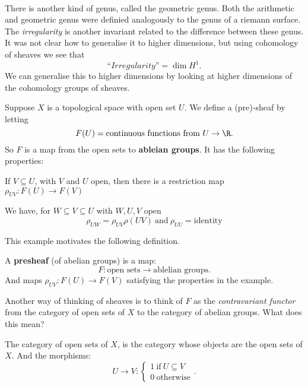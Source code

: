 \

There is another kind of genus, called the geometric genus. Both the arithmetic and geometric genus were definied analogously to the genus of a riemann surface. The \textit{irregularity} is another invariant related to the difference between these genus. It was not clear how to generalise it to higher dimensions, but using cohomology of sheaves we see that \[
   \textit{``Irregularity''}=\dim H^1.\]
 We can generalise this to higher dimensions by looking at higher dimensions of the cohomology groups of sheaves.


\begin{example}[]
    Suppose $X$ is a topological space with open set $U$. We define a (pre)-sheaf by letting  \[
    F(U) = \text{continuous functions from }U\rightarrow \R.\]
    So $F$ is a map from the open sets to \textbf{ableian groups}. It has the following properties:
    \begin{properties}
    \item If $V\subseteq U$, with  $V$ and  $U$ open, then there is a restriction map $\rho_{UV}\colon F(U)\rightarrow F(V)$
    \item We have, for $W\subseteq V\subseteq U$ with $W,U,V$ open \[
 \rho_{UW} = \rho_{UV}\rho(UV) \ \text{and} \ \rho_{UU} = \text{identity}
\] 
    \end{properties}
\end{example}

This example motivates the following definition.

\begin{definition}
A \textbf{presheaf} (of abelian groups) is a map: \[
    F\colon \text{open sets}\rightarrow \text{ablelian groups}
.\]
And maps $\rho_{UV}\colon F(U)\rightarrow F(V)$ satisfying the properties in the example.
\end{definition}


Another way of thinking of sheaves is to think of $F$ as the \textit{contravariant functor} from the category of open sets of $X$ to the category of abelian groups. What does this mean?

\begin{definition}
    The category of open sets of $X$, is the category whose objects are the open sets of $X$. And the morphisms:
    \[ 
    U\rightarrow V\colon
    \begin{cases}
    1 \ \text{if} \ U\subseteq V\\
    0 \ \text{otherwise}
    \end{cases}.\]
\end{definition}

